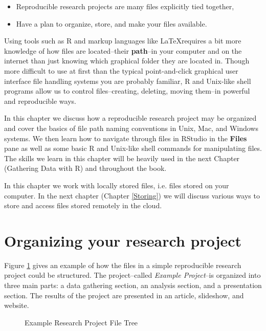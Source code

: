 \documentclass[ChapterTOCs,krantz1]{krantz}\usepackage{graphicx, color}
\begin{document}
{{\begin{itemize}
    \item Reproducible research projects are many files explicitly tied together,
    \item Have a plan to organize, store, and make your files available. 
\end{itemize}

Using tools such as R and markup languages like \LaTeX requires a bit more knowledge of how files are located--their {\bf{path}}--in your computer and on the internet than just knowing which graphical folder they are located in. Though more difficult to use at first than the typical point-and-click graphical user interface file handling systems you are probably familiar, R and Unix-like shell programs allow us to control files--creating, deleting, moving them--in powerful and reproducible ways. 

In this chapter we discuss how a reproducible research project may be organized and cover the basics of file path naming conventions in Unix, Mac, and Windows systems. We then learn how to navigate through files in RStudio in the {\bf{Files}} pane as well as some basic R and Unix-like shell commands for manipulating files. The skills we learn in this chapter will be heavily used in the next Chapter (Gathering Data with R) and throughout the book.

In this chapter we work with locally stored files, i.e. files stored on your computer. In the next chapter (Chapter \ref{Storing}) we will discuss various ways to store and access files stored remotely in the cloud.

\section{Organizing your research project}

Figure \ref{ExampleTree} gives an example of how the files in a simple reproducible research project could be structured. The project--called {\emph{Example Project}}--is organized into three main parts: a data gathering section, an analysis section, and a presentation section. The results of the project are presented in an article, slideshow, and website.

\clearpage
\thispagestyle{plain}
\begin{landscape}
\begin{figure}[th!]
    \caption{Example Research Project File Tree}
    \label{ExampleTree}
    \begin{center}
    

\end{center}
\end{figure}
\end{landscape}}}
\end{document}

